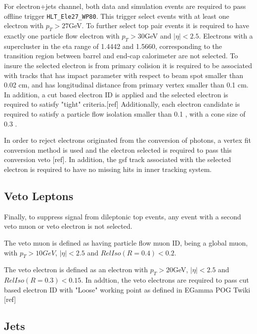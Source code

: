 \documentclass{cmspaperpdf}
\begin{document}
For electron+jets channel, both data and simulation events are required to pass offline trigger \texttt{HLT\_Ele27\_WP80}. This trigger select events with at least one electron with $p_T>27$GeV.  To further select top pair events it is required to have exactly one particle flow electron with $p_T>30$GeV and $|\eta|<2.5$. Electrons with a supercluster in the eta range of 1.4442 and 1.5660, corresponding to the transition region between barrel and end-cap calorimeter are not selected. To insure the selected electron is from primary colision it is required to be associated with tracks that has impact parameter with respect to beam spot smaller than 0.02 cm, and has longitudinal distance from primary vertex smaller than 0.1 cm. In addition, a cut based electron ID is applied and the selected electron is required to satisfy "tight" criteria.[ref] Additionally, each electron candidate is required to satisfy a particle flow isolation smaller than 0.1 , with a cone size of 0.3 . 

In order to reject electrons originated from the conversion of photons, a vertex fit conversion method is used and the electron selected is required to pass this conversion veto [ref]. In addition, the gsf track associated with the selected electron is required to have no missing hits in inner tracking system.


\subsection{Veto Leptons}
Finally, to suppress signal from dileptonic top events, any event with a second veto muon or veto electron is not selected.

The veto muon is defined as having particle flow muon ID, being a global muon, with $p_T>10 GeV$, $|\eta|<2.5$ and $RelIso(R=0.4)<0.2$.

The veto electron is defined as an electron with $p_T>20$GeV, $|\eta|<2.5$ and $RelIso(R=0.3)<0.15$. In addtion, the veto electrons are required to pass cut based electron ID with "Loose" working point as defined in EGamma POG Twiki [ref]

\subsection{Jets}
\end{document}
